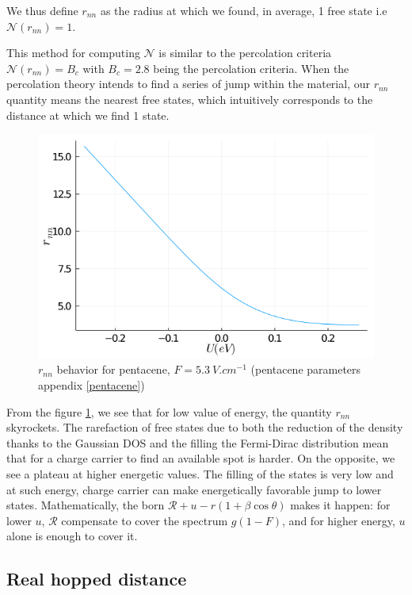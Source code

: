 We thus define $r_{nn}$ as the radius at which we found, in average, 1 free state i.e $\mathcal{N}(r_{nn}) = 1$.

This method for computing $\mathscr{N}$ is similar to the percolation criteria $\mathcal{N}(r_{nn}) = B_c$ with $B_c = 2.8$ being the percolation criteria. When the percolation theory intends to find a series of jump within the material, our $r_{nn}$ quantity means the nearest free states, which intuitively corresponds to the distance at which we find 1 state.

\begin{figure}[!h]
    \centering
    \includegraphics*[width=.5\paperwidth]{figures/3_elec/rnn.png}
    \caption{$r_{nn}$ behavior for pentacene, $F = \SI{5.3}{V . cm^{-1}}$ (pentacene parameters appendix \ref{pentacene})\label{fig:3_3}}
\end{figure}

From the figure \ref{fig:3_3}, we see that for low value of energy, the quantity $r_{nn}$ skyrockets. The rarefaction of free states due to both the reduction of the density thanks to the Gaussian DOS and the filling the Fermi-Dirac distribution mean that for a charge carrier to find an available spot is harder. On the opposite, we see a plateau at higher energetic values. The filling of the states is very low and at such energy, charge carrier can make energetically favorable jump to lower states. Mathematically, the born $\mathscr{R}+u-r(1+\beta \cos \theta)$ makes it happen: for lower $u$, $\mathscr{R}$ compensate to cover the spectrum $g(1 - F)$, and for higher energy, $u$ alone is enough to cover it.

\subsection{Real hopped distance}

